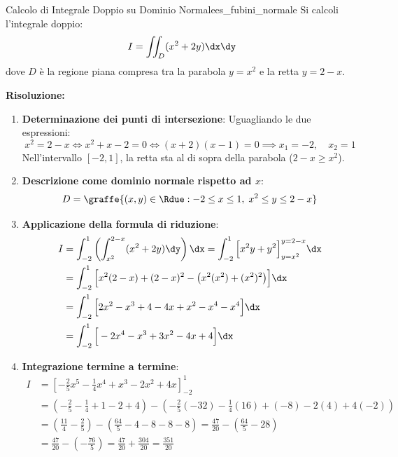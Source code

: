 \begin{esempio}{Calcolo di Integrale Doppio su Dominio Normale}{es_fubini_normale}
Si calcoli l'integrale doppio:
\[
I = \iint_D (x^2 + 2y) \dx\dy
\]
dove $D$ è la regione piana compresa tra la parabola $y = x^2$ e la retta $y = 2 - x$.

\medskip\noindent\textbf{Risoluzione:}
\begin{enumerate}
    \item \textbf{Determinazione dei punti di intersezione}:
    Uguagliando le due espressioni:
    \[
    x^2 = 2 - x \iff x^2 + x - 2 = 0 \iff (x + 2)(x - 1) = 0 \implies x_1 = -2, \quad x_2 = 1
    \]
    Nell'intervallo $[-2, 1]$, la retta sta al di sopra della parabola ($2 - x \ge x^2$).
    \item \textbf{Descrizione come dominio normale rispetto ad $x$}:
    \[
    D = \graffe{(x,y) \in \Rdue : -2 \le x \le 1, \; x^2 \le y \le 2 - x}
    \]
    \item \textbf{Applicazione della formula di riduzione}:
    \begin{align*}
    I &= \int_{-2}^{1} \left( \int_{x^2}^{2-x} (x^2 + 2y) \dy \right) \dx = \int_{-2}^{1} \Big[ x^2 y + y^2 \Big]_{y = x^2}^{y = 2-x} \dx \\
    &= \int_{-2}^{1} \Big[ x^2(2 - x) + (2 - x)^2 - \big( x^2(x^2) + (x^2)^2 \big) \Big] \dx \\
    &= \int_{-2}^{1} \Big[ 2x^2 - x^3 + 4 - 4x + x^2 - x^4 - x^4 \Big] \dx \\
    &= \int_{-2}^{1} \Big[ -2x^4 - x^3 + 3x^2 - 4x + 4 \Big] \dx
    \end{align*}
    \item \textbf{Integrazione termine a termine}:
    \begin{align*}
    I &= \left[ -\frac{2}{5}x^5 - \frac{1}{4}x^4 + x^3 - 2x^2 + 4x \right]_{-2}^{1} \\
    &= \left( -\frac{2}{5} - \frac{1}{4} + 1 - 2 + 4 \right) - \left( -\frac{2}{5}(-32) - \frac{1}{4}(16) + (-8) - 2(4) + 4(-2) \right) \\
    &= \left( \frac{11}{4} - \frac{2}{5} \right) - \left( \frac{64}{5} - 4 - 8 - 8 - 8 \right) = \frac{47}{20} - \left( \frac{64}{5} - 28 \right) \\
    &= \frac{47}{20} - \left( -\frac{76}{5} \right) = \frac{47}{20} + \frac{304}{20} = \frac{351}{20}
    \end{align*}
\end{enumerate}
\end{esempio}

